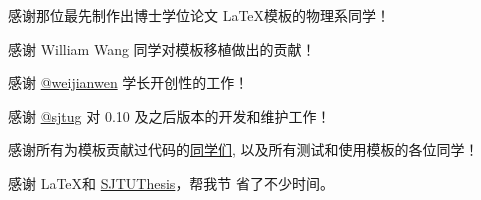 
\begin{acknowledgements}
  感谢那位最先制作出博士学位论文 \LaTeX 模板的物理系同学！

  感谢 William Wang 同学对模板移植做出的贡献！

  感谢 \href{https://github.com/weijianwen}{@weijianwen} 学长开创性的工作！

  感谢 \href{https://github.com/sjtug}{@sjtug} 对 0.10 及之后版本的开发和维护工作！

  感谢所有为模板贡献过代码的\href{https://github.com/sjtug/SJTUThesis/graphs/contributors}{同学们}, 以及所有测试和使用模板的各位同学！

  感谢 \LaTeX 和 \href{https://github.com/sjtug/SJTUThesis}{SJTUThesis}，帮我节
  省了不少时间。
\end{acknowledgements}
